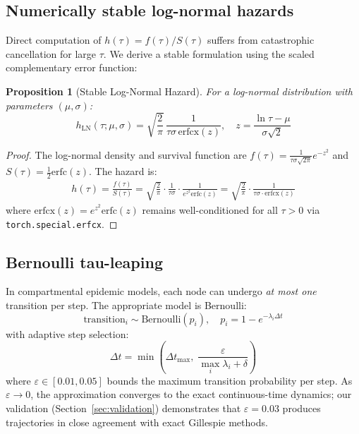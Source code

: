 \documentclass[a4paper,fleqn]{cas-sc}
\newtheorem{proposition}{Proposition}
\theoremstyle{definition}
\theoremstyle{remark}
\begin{document}
\subsection{Numerically stable log-normal hazards}

Direct computation of $h(\tau) = f(\tau)/S(\tau)$ suffers from catastrophic cancellation for large $\tau$. We derive a stable formulation using the scaled complementary error function:

\begin{proposition}[Stable Log-Normal Hazard]
For a log-normal distribution with parameters $(\mu, \sigma)$:
\begin{equation}\label{eq:stable_hazard}
h_{\mathrm{LN}}(\tau; \mu, \sigma) = \sqrt{\frac{2}{\pi}} \,\frac{1}{\tau \sigma \,\mathrm{erfcx}(z)}, \quad z = \frac{\ln \tau - \mu}{\sigma\sqrt{2}}
\end{equation}
\end{proposition}

\begin{proof}
The log-normal density and survival function are $f(\tau) = \frac{1}{\tau \sigma \sqrt{2\pi}} e^{-z^2}$ and $S(\tau) = \frac{1}{2} \mathrm{erfc}(z)$. The hazard is:
\begin{align}
    h(\tau) = \frac{f(\tau)}{S(\tau)} = \sqrt{\frac{2}{\pi}} \cdot \frac{1}{\tau \sigma} \cdot \frac{1}{e^{z^2} \mathrm{erfc}(z)} = \sqrt{\frac{2}{\pi}} \cdot \frac{1}{\tau \sigma \cdot \mathrm{erfcx}(z)}
\end{align}
where $\mathrm{erfcx}(z) = e^{z^2} \mathrm{erfc}(z)$ remains well-conditioned for all $\tau > 0$ via \texttt{torch.special.erfcx}.
\end{proof}

\subsection{Bernoulli tau-leaping}

In compartmental epidemic models, each node can undergo \emph{at most one} transition per step. The appropriate model is Bernoulli:
\begin{equation}
    \text{transition}_i \sim \text{Bernoulli}(p_i), \quad p_i = 1 - e^{-\lambda_i \Delta t}
\end{equation}
with adaptive step selection:
\begin{equation}
    \Delta t = \min\left(\Delta t_{\max},\; \frac{\varepsilon}{\max_i \lambda_i + \delta}\right)
\end{equation}
where $\varepsilon \in [0.01, 0.05]$ bounds the maximum transition probability per step. As $\varepsilon \to 0$, the approximation converges to the exact continuous-time dynamics; our validation (Section~\ref{sec:validation}) demonstrates that $\varepsilon = 0.03$ produces trajectories in close agreement with exact Gillespie methods.
\end{document}
